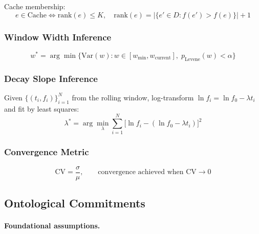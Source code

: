 Cache membership:
\begin{equation}
  e \in \text{Cache} \iff \text{rank}(e) \leq K, \quad
  \text{rank}(e) = \bigl|\{e' \in D : f(e') > f(e)\}\bigr| + 1
\end{equation}

\subsubsection{Window Width Inference}

\begin{equation}
  w^* = \arg\min \bigl\{\text{Var}(w) : w \in [w_{\min}, w_{\text{current}}],\;
        p_{\text{Levene}}(w) < \alpha\bigr\}
\end{equation}

\subsubsection{Decay Slope Inference}

Given $\{(t_i, f_i)\}_{i=1}^N$ from the rolling window, log-transform
$\ln f_i = \ln f_0 - \lambda t_i$ and fit by least squares:
\begin{equation}
  \lambda^* = \arg\min_\lambda \sum_{i=1}^N \bigl[\ln f_i - (\ln f_0 - \lambda t_i)\bigr]^2
\end{equation}

\subsubsection{Convergence Metric}

\begin{equation}
  \text{CV} = \frac{\sigma}{\mu}, \qquad
  \text{convergence achieved when } \text{CV} \to 0
\end{equation}

\subsection{Ontological Commitments}

\paragraph{Foundational assumptions.}

